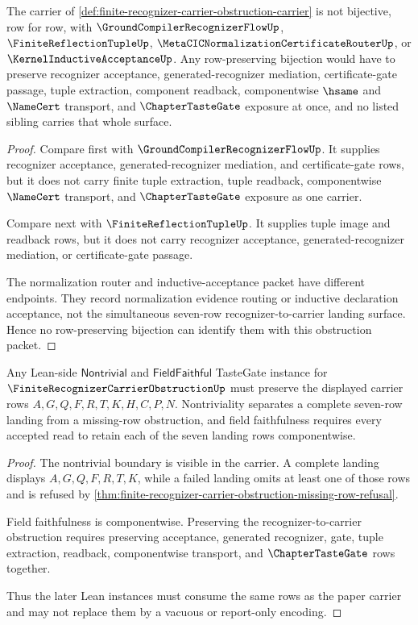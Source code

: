 \begin{theorem}
\label{thm:finite-recognizer-carrier-obstruction-sibling-nonbijection}
The carrier of \autoref{def:finite-recognizer-carrier-obstruction-carrier} is not bijective, row for row, with $\GroundCompilerRecognizerFlowUp$, $\FiniteReflectionTupleUp$, $\MetaCICNormalizationCertificateRouterUp$, or $\KernelInductiveAcceptanceUp$. Any row-preserving bijection would have to preserve recognizer acceptance, generated-recognizer mediation, certificate-gate passage, tuple extraction, component readback, componentwise $\hsame$ and $\NameCert$ transport, and $\ChapterTasteGate$ exposure at once, and no listed sibling carries that whole surface.
\end{theorem}
\begin{proof}
Compare first with $\GroundCompilerRecognizerFlowUp$. It supplies recognizer acceptance, generated-recognizer mediation, and certificate-gate rows, but it does not carry finite tuple extraction, tuple readback, componentwise $\NameCert$ transport, and $\ChapterTasteGate$ exposure as one carrier.

Compare next with $\FiniteReflectionTupleUp$. It supplies tuple image and readback rows, but it does not carry recognizer acceptance, generated-recognizer mediation, or certificate-gate passage.

The normalization router and inductive-acceptance packet have different endpoints. They record normalization evidence routing or inductive declaration acceptance, not the simultaneous seven-row recognizer-to-carrier landing surface. Hence no row-preserving bijection can identify them with this obstruction packet.
\end{proof}

\begin{theorem}
\label{thm:finite-recognizer-carrier-obstruction-tastegate-followup-surface}
Any Lean-side $\mathsf{Nontrivial}$ and $\mathsf{FieldFaithful}$ TasteGate instance for $\FiniteRecognizerCarrierObstructionUp$ must preserve the displayed carrier rows $A,G,Q,F,R,T,K,H,C,P,N$. Nontriviality separates a complete seven-row landing from a missing-row obstruction, and field faithfulness requires every accepted read to retain each of the seven landing rows componentwise.
\end{theorem}
\begin{proof}
The nontrivial boundary is visible in the carrier. A complete landing displays $A,G,Q,F,R,T,K$, while a failed landing omits at least one of those rows and is refused by \autoref{thm:finite-recognizer-carrier-obstruction-missing-row-refusal}.

Field faithfulness is componentwise. Preserving the recognizer-to-carrier obstruction requires preserving acceptance, generated recognizer, gate, tuple extraction, readback, componentwise transport, and $\ChapterTasteGate$ rows together.

Thus the later Lean instances must consume the same rows as the paper carrier and may not replace them by a vacuous or report-only encoding.
\end{proof}

